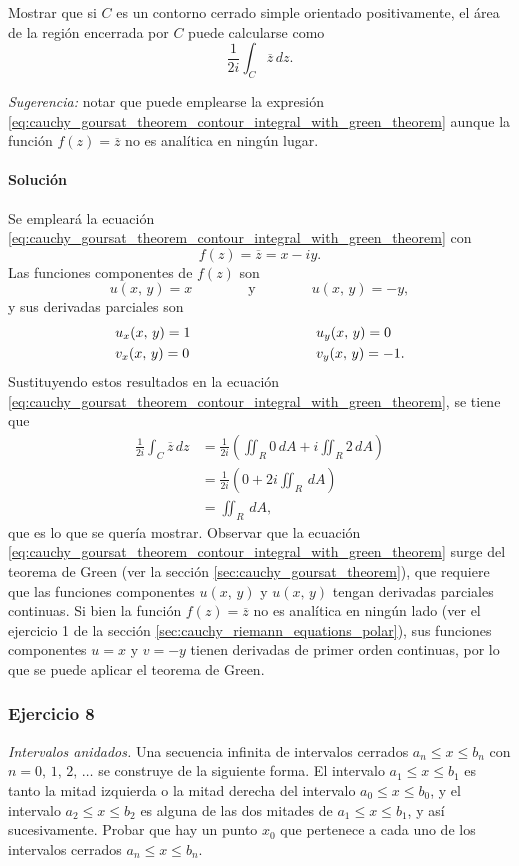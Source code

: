 \documentclass[a4paper]{report}
\begin{document}
Mostrar que si \(C\) es un contorno cerrado simple orientado positivamente, el área de la región encerrada por \(C\) puede calcularse como
\[
 \frac{1}{2i}\int_C\overline{z}\,dz.
\]

\emph{Sugerencia: } notar que puede emplearse la expresión \ref{eq:cauchy_goursat_theorem_contour_integral_with_green_theorem} aunque la función \(f(z)=\overline{z}\) no es analítica en ningún lugar.

\paragraph{Solución} Se empleará la ecuación \ref{eq:cauchy_goursat_theorem_contour_integral_with_green_theorem} con
\[
 f(z)=\overline{z}=x-iy.
\]
Las funciones componentes de \(f(z)\) son
\[
 u(x,\,y)=x
 \qquad\qquad\textrm{y}\qquad\qquad
 u(x,\,y)=-y,
\]
y sus derivadas parciales son
\[
 \begin{array}{ll}
  u_x(x,\,y)=1\qquad\qquad\qquad\qquad&u_y(x,\,y)=0\\[\smallskipamount]
  v_x(x,\,y)=0\qquad\qquad\qquad\qquad&v_y(x,\,y)=-1.
 \end{array}
\] 
Sustituyendo estos resultados en la ecuación \ref{eq:cauchy_goursat_theorem_contour_integral_with_green_theorem}, se tiene que 
\begin{align*}
 \frac{1}{2i}\int_C \overline{z}\,dz&=\frac{1}{2i}\left(\iint_R0\,dA+i\iint_R2\,dA\right)\\
   &=\frac{1}{2i}\left(0+2i\iint_R\,dA\right)\\
   &=\iint_R\,dA,
\end{align*}
que es lo que se quería mostrar. Observar que la ecuación \ref{eq:cauchy_goursat_theorem_contour_integral_with_green_theorem} surge del teorema de Green (ver la sección \ref{sec:cauchy_goursat_theorem}), que requiere que las funciones componentes \(u(x,\,y)\) y \(u(x,\,y)\) tengan derivadas parciales continuas. Si bien la función \(f(z)=\overline{z}\) no es analítica en ningún lado (ver el ejercicio 1 de la sección \ref{sec:cauchy_riemann_equations_polar}), sus funciones componentes \(u=x\) y \(v=-y\) tienen derivadas de primer orden continuas, por lo que se puede aplicar el teorema de Green.

\subsubsection*{Ejercicio 8}

\emph{Intervalos anidados.} Una secuencia infinita de intervalos cerrados \(a_n\leq x\leq b_n\) con \(n=0,\,1,\,2,\,\dots\) se construye de la siguiente forma. El intervalo \(a_1\leq x\leq b_1\) es tanto la mitad izquierda o la mitad derecha del intervalo \(a_0\leq x\leq b_0\), y el intervalo \(a_2\leq x\leq b_2\) es alguna de las dos mitades de \(a_1\leq x\leq b_1\), y así sucesivamente. Probar que hay un punto \(x_0\) que pertenece a cada uno de los intervalos cerrados \(a_n\leq x\leq b_n\).
\end{document}
